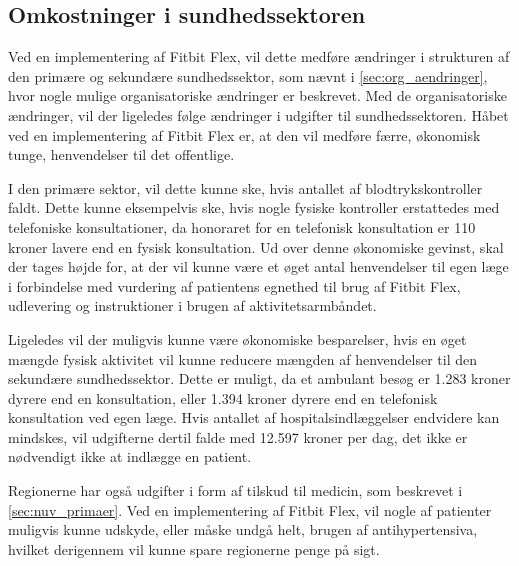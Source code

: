 \subsection{Omkostninger i sundhedssektoren}



Ved en implementering af Fitbit Flex, vil dette medføre ændringer i strukturen af den primære og sekundære sundhedssektor, som nævnt i \autoref{sec:org_aendringer}, hvor nogle mulige organisatoriske ændringer er beskrevet. Med de organisatoriske ændringer, vil der ligeledes følge ændringer i udgifter til sundhedssektoren. 
Håbet ved en implementering af Fitbit Flex er, at den vil medføre færre, økonomisk tunge, henvendelser til det offentlige. 

I den primære sektor, vil dette kunne ske, hvis antallet af blodtrykskontroller faldt. Dette kunne eksempelvis ske, hvis nogle fysiske kontroller erstattedes med telefoniske konsultationer, da honoraret for en telefonisk konsultation er 110 kroner lavere end en fysisk konsultation. Ud over denne økonomiske gevinst, skal der tages højde for, at der vil kunne være et øget antal henvendelser til egen læge i forbindelse med vurdering af patientens egnethed til brug af Fitbit Flex, udlevering og instruktioner i brugen af aktivitetsarmbåndet. 
 
Ligeledes vil der muligvis kunne være økonomiske besparelser, hvis en øget mængde fysisk aktivitet vil kunne reducere mængden af henvendelser til den sekundære sundhedssektor. Dette er muligt, da et ambulant besøg er 1.283 kroner dyrere end en konsultation, eller 1.394 kroner dyrere end en telefonisk konsultation ved egen læge. Hvis antallet af hospitalsindlæggelser endvidere kan mindskes, vil udgifterne dertil falde med 12.597 kroner per dag, det ikke er nødvendigt ikke at indlægge en patient. 

Regionerne har også udgifter i form af tilskud til medicin, som beskrevet i \autoref{sec:nuv_primaer}. Ved en implementering af Fitbit Flex, vil nogle af patienter muligvis kunne udskyde, eller måske undgå helt, brugen af antihypertensiva, hvilket derigennem vil kunne spare regionerne penge på sigt.

